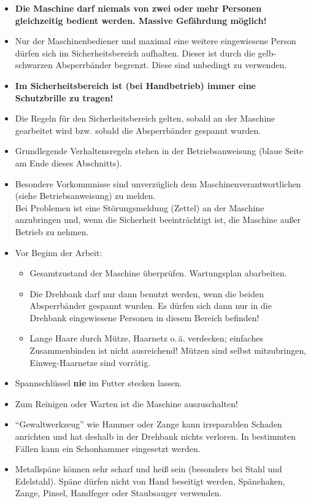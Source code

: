 \documentclass{\basedir/fablab-document}
\begin{document}
\begin{itemize}
\item \textbf{Die Maschine darf niemals von zwei oder mehr Personen gleichzeitig bedient werden. Massive Gefährdung möglich!}
\item Nur der Maschinenbediener und maximal eine weitere eingewiesene Person dürfen sich im Sicherheitsbereich aufhalten. Dieser ist durch die gelb-schwarzen Absperrbänder begrenzt. Diese sind unbedingt zu verwenden.
\item \textbf{Im Sicherheitsbereich ist (bei Handbetrieb) immer eine Schutzbrille zu tragen!}
\item Die Regeln für den Sicherheitsbereich gelten, sobald an der Maschine gearbeitet wird bzw. sobald die Absperrbänder gespannt wurden.
\item Grundlegende Verhaltensregeln stehen in der Betriebsanweisung (blaue Seite am Ende dieses Abschnitts).
\item Besondere Vorkommnisse sind unverzüglich dem Maschinenverantwortlichen (siehe Betriebsanweisung) zu melden.\\
Bei Problemen ist eine Störungsmeldung (Zettel) an der Maschine anzubringen und, wenn die Sicherheit beeinträchtigt ist, die Maschine außer Betrieb zu nehmen.

\item Vor Beginn der Arbeit:
\begin{itemize}
\item Gesamtzustand der Maschine überprüfen. Wartungsplan abarbeiten.
\item Die Drehbank darf nur dann benutzt werden, wenn die beiden Absperrbänder gespannt wurden. Es dürfen sich dann nur in die Drehbank eingewiesene Personen in diesem Bereich befinden!
\item Lange Haare durch Mütze, Haarnetz o.\,ä. verdecken; einfaches Zusammenbinden ist nicht ausreichend! Mützen sind selbst mitzubringen, Einweg-Haarnetze sind vorrätig.
\end{itemize}

 \item Spannschlüssel \textbf{nie} im Futter stecken lassen.
 \item Zum Reinigen oder Warten ist die Maschine auszuschalten!
 \item \enquote{Gewaltwerkzeug} wie Hammer oder Zange kann irreparablen Schaden anrichten und hat deshalb in der Drehbank nichts verloren. In bestimmten Fällen kann ein Schonhammer eingesetzt werden. %
 \item Metallspäne können sehr scharf und heiß sein (besonders bei Stahl und Edelstahl). Späne dürfen nicht von Hand beseitigt werden, Spänehaken, Zange, Pinsel, Handfeger oder Staubsauger verwenden. %


\end{itemize}
\end{document}
